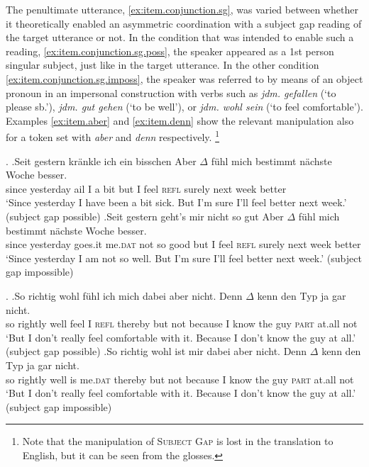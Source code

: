 The penultimate utterance, \ref{ex:item.conjunction.sg}, was varied between whether it theoretically enabled an asymmetric coordination with a subject gap reading of the target utterance or not.
In the condition that was intended to enable such a reading, \ref{ex:item.conjunction.sg.poss}, the speaker appeared as a 1st person singular subject, just like in the target utterance.
In the other condition \ref{ex:item.conjunction.sg.imposs}, the speaker was referred to by means of an object pronoun in an impersonal construction with verbs such as \textit{jdm. gefallen} (`to please sb.'), \textit{jdm. gut gehen} (`to be well'), or \textit{jdm. wohl sein} (`to feel comfortable').
Examples \ref{ex:item.aber} and \ref{ex:item.denn} show the relevant manipulation also for a token set with \textit{aber} and \textit{denn} respectively.%
\footnote{Note that the manipulation of \textsc{Subject Gap} is lost in the translation to English, but it can be seen from the glosses.}
%

\ex.\label{ex:item.aber}
\ag.Seit gestern kränkle ich ein bisschen\phantom{mi} Aber $\Delta$ fühl mich bestimmt nächste Woche besser.\\
since yesterday ail I a bit but I feel \textsc{refl} surely next week better\\
`Since yesterday I have been a bit sick. But I'm sure I'll feel better next week.' \hfill (subject gap possible)
\bg.Seit gestern geht's mir nicht so gut\phantom{mi} Aber $\Delta$ fühl mich bestimmt nächste Woche besser.\\
since yesterday goes.it me.\textsc{dat} not so good but I feel \textsc{refl} surely next week better\\
`Since yesterday I am not so well. But I'm sure I'll feel better next week.' \hfill (subject gap impossible)

\ex.\label{ex:item.denn}
\ag.So richtig wohl fühl ich mich dabei aber nicht.	Denn $\Delta$ kenn den Typ ja gar nicht.\\
so rightly well feel I \textsc{refl} thereby but not because I know the guy \textsc{part} at.all not\\
`But I don't really feel comfortable with it. Because I don't know the guy at all.' \hfill (subject gap possible)
\bg.So richtig wohl ist mir dabei aber nicht.	 Denn $\Delta$ kenn den Typ ja gar nicht.\\
so rightly well is me.\textsc{dat} thereby but not because I know the guy \textsc{part} at.all not\\
`But I don't really feel comfortable with it. Because I don't know the guy at all.' \hfill (subject gap impossible)

